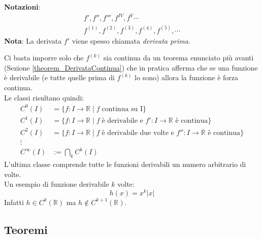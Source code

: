 \textbf{Notazioni}:
\begin{gather*}
	f', f'', f''', f^{IV}, f^{V} \cdots\\
	f^{(1)}, f^{(2)}, f^{(3)}, f^{(4)}, f^{(5)}, \cdots
\end{gather*}
\textbf{Nota}: La derivata $f'$ viene spesso chiamata \textit{derivata prima}.

Ci basta imporre solo che $f^{(k)}$ sia continua da un teorema enunciato più avanti (Sezione \ref{theorem_DerivataContinua}) che in pratica afferma che se una funzione è derivabile (e tutte quelle prima di $f^{(k)}$ lo sono) allora la funzione è forza continua.\\

Le classi risultano quindi:
\begin{align*}
	C^0 (I) &= \{f: I \to \mathbb{R}\; |\; f \; \text{continua su I}\}\\
	C^1 (I) &= \{f: I \to \mathbb{R}\; |\; f \; \text{è derivabile e } f':I \to \mathbb{R} \text{ è continua}\}\\
	C^2 (I) &= \{f: I \to \mathbb{R}\; |\; f \; \text{è derivabile due volte e } f'':I \to \mathbb{R} \text{ è continua}\}\\
	\vdots\\
	C^\infty (I) &:= \bigcap_{k} C^k (I)
\end{align*}
L'ultima classe comprende tutte le funzioni derivabili un numero arbitrario di volte.\\

Un esempio di funzione derivabile $k$ volte:
\begin{equation*}
	h(x) = x^k |x|  
\end{equation*}
Infatti $h \in C^k (\mathbb{R})$ ma $h \not \in C^{k+1} (\mathbb{R})$.

\subsection{Teoremi}

